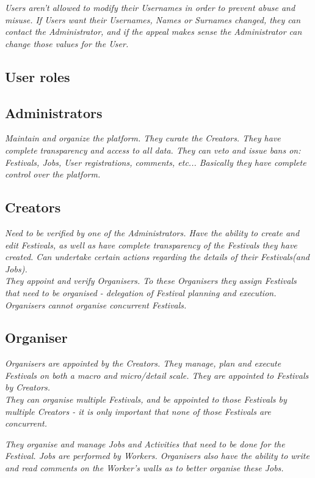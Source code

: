 	\textit{Users aren't allowed to modify their Usernames in order to prevent abuse and misuse. If Users want their Usernames, Names or Surnames changed, they can contact the Administrator, and if the appeal makes sense the Administrator can change those values for the User.}
	
	\subsection{User roles}
		\subsection{Administrators}
		\textit{Maintain and organize the platform. They curate the Creators. They have complete transparency and access to all data. They can veto and issue bans on: Festivals, Jobs, User registrations, comments, etc... Basically they have complete control over the platform.}		
		
		\subsection{Creators}
		\textit{Need to be verified by one of the Administrators. Have the ability to create and edit Festivals, as well as have complete transparency of the Festivals they have created. Can undertake certain actions regarding the details of their Festivals(and Jobs).}\\
		
		\textit{They appoint and verify Organisers. To these Organisers they assign Festivals that need to be organised - delegation of Festival planning and execution. Organisers cannot organise concurrent Festivals.}
		
		\subsection{Organiser}
		\textit{Organisers are appointed by the Creators. They manage, plan and execute Festivals on both a macro and micro/detail scale. They are appointed to Festivals by Creators.}\\
		
		\textit{They can organise multiple Festivals, and be appointed to those Festivals by multiple Creators - it is only important that none of those Festivals are concurrent.}
		
		\textit{They organise and manage Jobs and Activities that need to be done for the Festival. Jobs are performed by Workers. Organisers also have the ability to write and read comments on the Worker's walls as to better organise these Jobs.}
		
